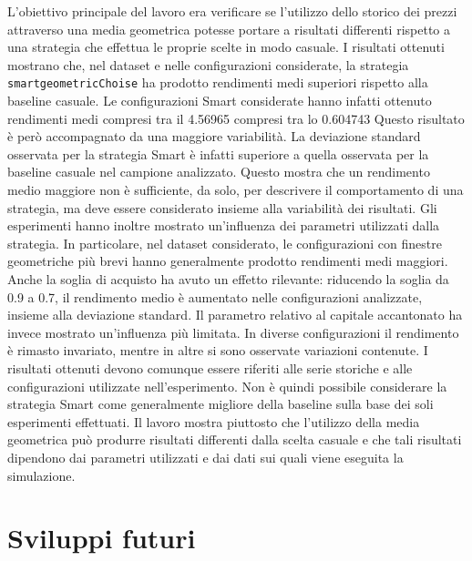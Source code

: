 \documentclass[a4paper,oneside,italian]{sapthesis}
\begin{document}
L'obiettivo principale del lavoro era verificare se l'utilizzo dello storico dei
prezzi attraverso una media geometrica potesse portare a risultati differenti rispetto
a una strategia che effettua le proprie scelte in modo casuale.
I risultati ottenuti mostrano che, nel dataset e nelle configurazioni considerate,
la strategia \texttt{smartgeometricChoise} ha prodotto rendimenti medi superiori rispetto
alla baseline casuale. Le configurazioni Smart considerate hanno infatti ottenuto rendimenti
medi compresi tra il 4.56965%
compresi tra lo 0.604743%
Questo risultato è però accompagnato da una maggiore variabilità. La deviazione standard
osservata per la strategia Smart è infatti superiore a quella osservata per la baseline
casuale nel campione analizzato. Questo mostra che un rendimento medio maggiore non è
sufficiente, da solo, per descrivere il comportamento di una strategia, ma deve essere
considerato insieme alla variabilità dei risultati.
Gli esperimenti hanno inoltre mostrato un'influenza dei parametri utilizzati dalla strategia.
In particolare, nel dataset considerato, le configurazioni con finestre geometriche più brevi
hanno generalmente prodotto rendimenti medi maggiori. Anche la soglia di acquisto ha avuto un
effetto rilevante: riducendo la soglia da 0.9 a 0.7, il rendimento medio è aumentato nelle
configurazioni analizzate, insieme alla deviazione standard.
Il parametro relativo al capitale accantonato ha invece mostrato un'influenza più limitata.
In diverse configurazioni il rendimento è rimasto invariato, mentre in altre si sono osservate variazioni contenute.
I risultati ottenuti devono comunque essere riferiti alle serie storiche e alle configurazioni
utilizzate nell'esperimento. Non è quindi possibile considerare la strategia Smart come
generalmente migliore della baseline sulla base dei soli esperimenti effettuati. Il lavoro
mostra piuttosto che l'utilizzo della media geometrica può produrre risultati differenti dalla
scelta casuale e che tali risultati dipendono dai parametri utilizzati e dai dati sui quali
viene eseguita la simulazione.

\section{Sviluppi futuri}
\end{document}
